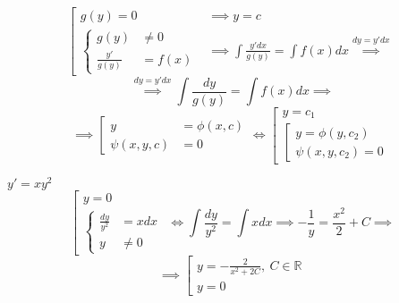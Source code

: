 \begin{note}[Алгоритм]
    \[
        \left[\begin{array}{rl}
            g(y) = 0 & \implies y = c                                                            \\
            \left\{
            \begin{array}{rl}
                g(y)            & \ne 0  \\
                \frac{y'}{g(y)} & = f(x)
            \end{array}
            \right.  & \implies \int \frac{y'dx}{g(y)} = \int f(x)dx \overset{dy=y'dx}{\implies}
        \end{array}\right.
    \]
    \[
        \overset{dy=y'dx}{\implies}\int \frac{dy}{g(y)} = \int f(x)dx \implies
    \]
    \[
        \implies\left[ \begin{array}{rl}
            y            & = \phi(x,c) \\
            \psi (x,y,c) & = 0
        \end{array}\right. \iff \left[\begin{array}{l}
            y = c_1 \\
            \left[\begin{array}{l}
                      y = \phi(y,c_2) \\
                      \psi(x,y,c_2) = 0
                  \end{array}
            \right.
        \end{array}\right.
    \]
\end{note}

\begin{example}
    $y' = xy^2$
    \[
        \left[\begin{array}{l}
            y = 0 \\
            \left\{\begin{array}{rl}
                       \frac{dy}{y^2} & = xdx \\
                       y              & \ne 0
                   \end{array}\right.
        \end{array}\right. \iff \int \frac{dy}{y^2} = \int xdx \implies -\frac{1}{y} = \frac{x^2}{2} + C \implies
    \]
    \[
        \implies\left[\begin{array}{l}
            y = -\frac{2}{x^2 + 2C}, \ C \in \mathbb{R} \\
            y = 0
        \end{array}\right.
    \]
\end{example}

